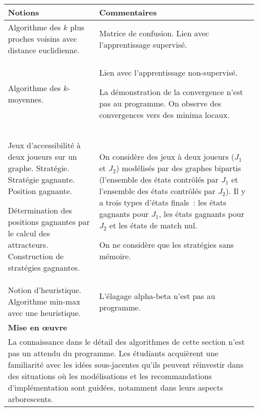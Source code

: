 \begin{longtable}{|p{\lnotion}|p{\comment}|}
    \hline
    \textbf{Notions} & \textbf{Commentaires} \\
    \hline \hline
    Algorithme des $k$ plus proches voisins avec distance euclidienne.&
    Matrice de confusion. Lien avec l'apprentissage supervisé. \\ \hline
    Algorithme des $k$-moyennes.&
    Lien avec l'apprentissage non-supervisé.
   
   	La démonstration de la convergence n'est pas au programme. On observe des convergences vers des minima locaux.\\ \hline
Jeux d’accessibilité à deux joueurs sur un graphe. Stratégie. Stratégie gagnante. Position gagnante.
    
      Détermination des positions gagnantes par le calcul des attracteurs. Construction de stratégies gagnantes.&
    	
    
    On considère des jeux à deux joueurs ($J_1$ et $J_2$) modélisés par des graphes bipartis (l’ensemble des états contrôlés par $J_1$ et l’ensemble des états contrôlés par $J_2$). Il y a trois types d’états finals~: les états gagnants pour $J_1$, les états gagnants pour $J_2$ et les états de match nul.
    
    On ne considère que les stratégies sans mémoire.
      \\
    
    \hline
    
    Notion d'heuristique. Algorithme min-max avec une heuristique. &
    	L'élagage alpha-beta n'est pas au programme.
    \\ 
	\hline \hline
    \multicolumn{2}{|p{\lmoe}|}{\textbf{Mise en \oe uvre}} \\
    \hline 
    \multicolumn{2}{|p{\lmoe}|}{
La connaissance dans le détail des algorithmes de cette section n'est pas un attendu du programme. Les étudiants acquièrent une familiarité avec les idées sous-jacentes qu'ils peuvent réinvestir dans des situations où les modélisations et les recommandations d'implémentation sont guidées, notamment dans leurs aspects arborescents.
        } \\
        \hline
\end{longtable}	
 
